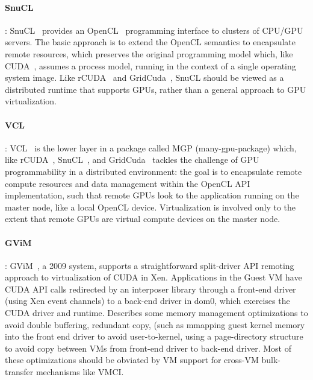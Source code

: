 \paragraph {\bf SnuCL}: SnuCL~\cite{kim2012snucl} provides an OpenCL~\cite{OpenCL} programming interface
	to clusters of CPU/GPU servers. The basic approach is to extend the OpenCL semantics to encapsulate
	remote resources, which preserves the original programming model which, like CUDA~\cite{CUDA}, assumes
	a process model, running in the context of a single operating system image. Like rCUDA~\cite{rCUDA}
	and GridCuda~\cite{GridCuda}, SnuCL should be viewed as a distributed runtime that supports GPUs,
	rather than a general approach to GPU virtualization.

\paragraph {\bf VCL}: VCL~\cite{VCL} is the lower layer in a package called MGP (many-gpu-package)
   which, like rCUDA~\cite{rCUDA}, SnuCL~\cite{kim2012snucl}, and GridCuda~\cite{GridCuda} tackles the challenge
   of GPU programmability in a distributed environment: the goal is to encapsulate remote compute resources and
   data management within the OpenCL API implementation, such that remote GPUs look to the application running on the
   master node, like a local OpenCL device. Virtualization is involved only to the extent that remote GPUs are
   virtual compute devices on the master node.

\paragraph {\bf GViM}: GViM~\cite{gupta2009gvim}, a 2009 system, supports a straightforward split-driver API remoting approach to virtualization
    of CUDA in Xen. Applications in the Guest VM have CUDA API calls redirected by an interposer library through
	a front-end driver (using Xen event channels) to a back-end driver in dom0, which exercises the CUDA driver and runtime.
	Describes some memory management optimizations to avoid double buffering, redundant copy, (such as mmapping guest
	kernel memory into the front end driver to avoid user-to-kernel, using a page-directory structure to avoid copy
	between VMs from front-end driver to back-end driver. Most of these optimizations should be obviated by
	VM support for cross-VM bulk-transfer mechanisms like VMCI.

